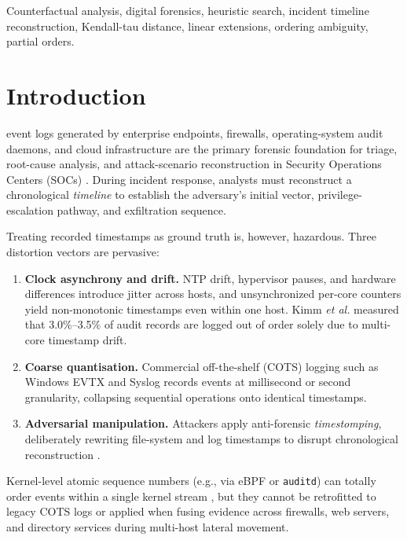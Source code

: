 \documentclass{ieeeaccess}
\begin{document}
\begin{keywords}
Counterfactual analysis, digital forensics, heuristic search, incident timeline reconstruction, Kendall-tau distance, linear extensions, ordering ambiguity, partial orders.
\end{keywords}

\titlepgskip=-15pt

\maketitle

\section{Introduction}\label{sec:intro}
 event logs generated by enterprise endpoints, firewalls, operating-system audit daemons, and cloud infrastructure are the primary forensic foundation for triage, root-cause analysis, and attack-scenario reconstruction in Security Operations Centers (SOCs) \cite{Hossain2017,Cheng2024}. During incident response, analysts must reconstruct a chronological \emph{timeline} to establish the adversary's initial vector, privilege-escalation pathway, and exfiltration sequence.

Treating recorded timestamps as ground truth is, however, hazardous. Three distortion vectors are pervasive:
\begin{enumerate}
\item \textbf{Clock asynchrony and drift.} NTP drift, hypervisor pauses, and hardware differences introduce jitter across hosts, and unsynchronized per-core counters yield non-monotonic timestamps even within one host. Kimm \emph{et al.} \cite{Kimm2026} measured that 3.0\%--3.5\% of audit records are logged out of order solely due to multi-core timestamp drift.
\item \textbf{Coarse quantisation.} Commercial off-the-shelf (COTS) logging such as Windows EVTX and Syslog records events at millisecond or second granularity, collapsing sequential operations onto identical timestamps.
\item \textbf{Adversarial manipulation.} Attackers apply anti-forensic \emph{timestomping}, deliberately rewriting file-system and log timestamps to disrupt chronological reconstruction \cite{Peisert2007}.
\end{enumerate}
Kernel-level atomic sequence numbers (e.g., via eBPF or \texttt{auditd}) can totally order events within a single kernel stream \cite{Kimm2026}, but they cannot be retrofitted to legacy COTS logs or applied when fusing evidence across firewalls, web servers, and directory services during multi-host lateral movement.
\end{document}
